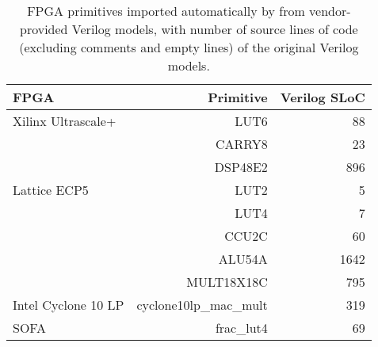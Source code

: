 \begin{table}
\caption{FPGA primitives imported 
  automatically by \lr from vendor-provided 
  Verilog models, with number of source lines of code 
  (excluding comments and empty lines) of 
  the original Verilog models.} 
\centering
\footnotesize
\label{table:imported-primitves}
\begin{tabular}{lrr}
 {\bf FPGA}   & \textbf{Primitive} & {\bf Verilog SLoC} \\\hline
 Xilinx Ultrascale+  & LUT6 & 88       \\
                     & CARRY8 & 23       \\
                     & DSP48E2 & 896       \\
                     \hline
 Lattice ECP5 & LUT2 & 5       \\
              & LUT4 & 7       \\
              & CCU2C & 60       \\
              & ALU54A & 1642 \\ 
              & MULT18X18C & 795 \\
              \hline
 Intel Cyclone 10 LP  & cyclone10lp\_mac\_mult   &  319       \\ 
              \hline
 SOFA      & frac\_lut4   &  69       \\ 
\end{tabular}
\end{table}










